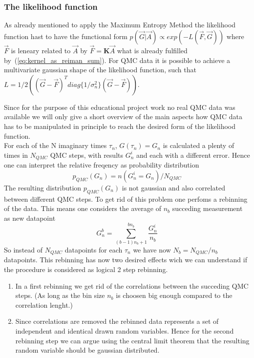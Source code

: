 \subsubsection{The likelihood function}

As already mentioned to apply the Maximum Entropy Method the likelihood function hast to have the functional form 
$ p(\vec{G}|\vec{A}) \propto exp(-L(\vec{F},\vec{G}))$ where $\vec{F}$ is leneary related to $\vec{A}$ by
$\vec{F} = \textbf{K} \vec{A}$ what is already fulfilled by~(\ref{eq:kernel_as_reiman_sum}). For QMC data it is 
possible to achieve a multivariate gaussian shape of the likelihood function, such that $L = 1/2 ((\vec{G} - \vec{F})^T 
diag\{1/ \sigma_n^2 \} (\vec{G} - \vec{F}))$.

Since for the purpose of this educational project work no real QMC data was available we will only give a short overview of
the main aspects how QMC data has to be manipulated in principle to reach the desired form of the likelihood function.\\
For each of the N imaginary times $\tau_n$, $G(\tau_n) = G_n$ is calculated a plenty of times in $N_{QMC}$ QMC steps, with results $G_n^i$ and each with a different error. 
Hence one can interpret the relative freqency as probability distribution \[ p_{QMC}(G_n)= n(G_n^i = G_n)/N_{QMC} \]
The resulting distribution $p_{QMC}(G_n)$ is not gaussian and also correlated between different QMC steps. To get rid
of this problem one perfoms a rebinning of the data. This means one considers the average of $n_b$ succeding measurement as new 
datapoint \[G_n^b = \sum_{(b-1) n_b + 1}^{b n_b} \frac{G_n^i}{n_b} \] 
\noindent So instead of $N_{QMC}$ datapoints for each $\tau_n$
we have now $N_b = N_{QMC}/n_b$ datapoints. This rebinning has now two desired effects wich we can understand if the
procedure is considered as logical 2 step rebinning. 
\begin{enumerate}
\item In a first rebinning we get rid of the correlations between the succeding QMC steps. (As long as the bin size $n_b$
 is choosen big enough compared to the correlation lenght.)
\item Since correlations are removed the rebinned data represents a set of independent and identical drawn random variables.
Hence for the second rebinning step we can argue using the central limit theorem that the resulting random variable should
be gaussian distributed.
\end{enumerate}

